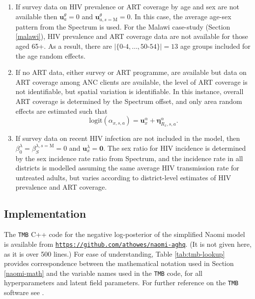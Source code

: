 \documentclass[a4paper, nobind]{templates/ociamthesis}
\providecommand{\tightlist}{%
  \setlength{\itemsep}{0pt}\setlength{\parskip}{0pt}}
\begin{document}
\begin{enumerate}
\def\labelenumi{\arabic{enumi}.}
\tightlist
\item
  If survey data on HIV prevalence or ART coverage by age and sex are not available then \(\mathbf{u}_a^\theta = 0\) and \(\mathbf{u}_{a, s = \text{M}}^\theta = 0\).
  In this case, the average age-sex pattern from the Spectrum is used.
  For the Malawi case-study (Section \ref{malawi}), HIV prevalence and ART coverage data are not available for those aged 65+.
  As a result, there are \(|\{\text{0-4}, \ldots, \text{50-54}\}| = 13\) age groups included for the age random effects.
\item
  If no ART data, either survey or ART programme, are available but data on ART coverage among ANC clients are available, the level of ART coverage is not identifiable, but spatial variation is identifiable.
  In this instance, overall ART coverage is determined by the Spectrum offset, and only area random effects are estimated such that
  \begin{equation}
  \text{logit} \left(\alpha_{x, s, a} \right) = \mathbf{u}_x^\alpha + \boldsymbol{\mathbf{\eta}}_{R_x, s, a}^\alpha.
  \end{equation}
\item
  If survey data on recent HIV infection are not included in the model, then \(\beta_0^\lambda = \beta_S^{\lambda, s = \text{M}} = 0\) and \(\mathbf{u}_x^\lambda = \mathbf{0}\).
  The sex ratio for HIV incidence is determined by the sex incidence rate ratio from Spectrum, and the incidence rate in all districts is modelled assuming the same average HIV transmission rate for untreated adults, but varies according to district-level estimates of HIV prevalence and ART coverage.
\end{enumerate}

\hypertarget{naomi-implementation}{%
\subsection{Implementation}\label{naomi-implementation}}

The \texttt{TMB} C++ code for the negative log-posterior of the simplified Naomi model is available from \href{https://github.com/athowes/naomi-aghq}{\texttt{https://github.com/athowes/naomi-aghq}}.
(It is not given here, as it is over 500 lines.)
For ease of understanding, Table \ref{tab:tmb-lookup} provides correspondence between the mathematical notation used in Section \ref{naomi-math} and the variable names used in the \texttt{TMB} code, for all hyperparameters and latent field parameters.
For further reference on the \texttt{TMB} software see \textcite{tmbdocumentation}.
\end{document}

